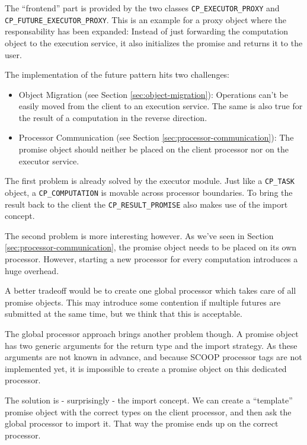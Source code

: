 The ``frontend'' part is provided by the two classes \lstinline!CP_EXECUTOR_PROXY! and \lstinline!CP_FUTURE_EXECUTOR_PROXY!.
This is an example for a proxy object where the responsability has been expanded:
Instead of just forwarding the computation object to the execution service, it also initializes the promise and returns it to the user.

The implementation of the future pattern hits two challenges:
\begin{itemize}
 \item Object Migration (see Section \ref{sec:object-migration}):
 Operations can't be easily moved from the client to an execution service.
 The same is also true for the result of a computation in the reverse direction.
 \item Processor Communication (see Section \ref{sec:processor-communication}):
 The promise object should neither be placed on the client processor nor on the executor service.
\end{itemize}

The first problem is already solved by the executor module. 
Just like a \lstinline!CP_TASK! object, a \lstinline!CP_COMPUTATION! is movable across processor boundaries.
To bring the result back to the client the \lstinline!CP_RESULT_PROMISE! also makes use of the import concept.

The second problem is more interesting however.
As we've seen in Section \ref{sec:processor-communication}, the promise object needs to be placed on its own processor.
However, starting a new processor for every computation introduces a huge overhead.

A better tradeoff would be to create one global processor which takes care of all promise objects.
This may introduce some contention if multiple futures are submitted at the same time, but we think that this is acceptable.

The global processor approach brings another problem though.
A promise object has two generic arguments for the return type and the import strategy.
As these arguments are not known in advance, and because SCOOP processor tags \cite[p. 90]{Nienaltowski07} are not implemented yet, it is impossible to create a promise object on this dedicated processor.

The solution is - surprisingly - the import concept.
We can create a ``template'' promise object with the correct types on the client processor, and then ask the global processor to import it.
That way the promise ends up on the correct processor.
